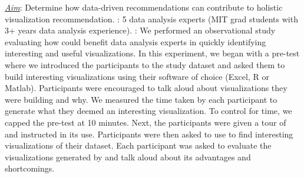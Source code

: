 

{\it \underline{Aim}}: Determine how data-driven 
recommendations can contribute to holistic visualization recommendation.
: 5 data analysis experts (MIT grad students with 3+ years data analysis experience).
: We performed an observational study evaluating how \SeeDB could benefit data analysis experts in quickly identifying interesting and useful visualizations.
In this experiment, we began with a pre-test where we introduced the participants to the study dataset and asked them to build interesting visualizations using their software of choice (Excel, R or Matlab).
Participants were encouraged to talk aloud about visualizations they were building and why.
We measured the time taken by each participant to generate what they deemed an interesting visualization.
To control for time, we capped the pre-test at 10 minutes.
Next, the participants were given a tour of \SeeDB and instructed in its use.
Participants were then asked to use \SeeDB to find interesting visualizations of their dataset.
Each participant was asked to evaluate the visualizations generated by \SeeDB and talk aloud about its advantages and shortcomings.\\
